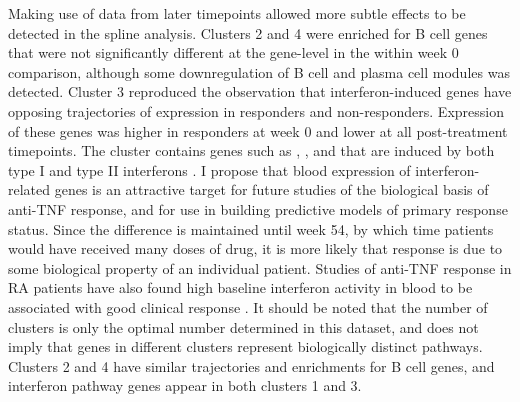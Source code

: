 Making use of data from later timepoints allowed more subtle effects to be detected in the spline analysis.
Clusters 2 and 4 were enriched for B cell genes that were not significantly different at the gene-level in the within week 0 comparison,
although some downregulation of B cell and plasma cell modules was detected.
Cluster 3 reproduced the observation that interferon-induced genes have opposing trajectories of expression in responders and non-responders.
Expression of these genes was higher in responders at week 0 and lower at all post-treatment timepoints.
The cluster contains genes such as , , and  that are induced by both type I and type II interferons \autocite{liu2012SystematicIdentificationType}.
I propose that blood expression of interferon-related genes is an attractive target for 
future studies of the biological basis of anti-\gls{TNF} response, and for 
use in building predictive models of primary response status.
Since the difference is maintained until week 54, by which time patients would have received many doses of drug,
it is more likely that response is due to some biological property of an individual patient.
Studies of anti-\gls{TNF} response in \gls{RA} patients have also 
found high baseline interferon activity in blood to be associated with good clinical response \autocite{mavragani2010AssociationResponseTumor,wright2015InterferonGeneExpression}.
%
It should be noted that the number of clusters is only the optimal number determined in this dataset,
and does not imply that genes in different clusters represent biologically distinct pathways.
Clusters 2 and 4 have similar trajectories and enrichments for B cell genes,
and interferon pathway genes appear in both clusters 1 and 3.

